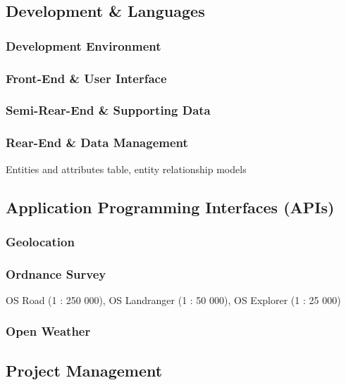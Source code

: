 \documentclass[11pt, english]{article}
\begin{document}
	\subsection{Development \& Languages}

		\subsubsection{Development Environment}

		\subsubsection{Front-End \& User Interface}

		\subsubsection{Semi-Rear-End \& Supporting Data}

		\subsubsection{Rear-End \& Data Management}

		Entities and attributes table, entity relationship models

	\subsection{Application Programming Interfaces (APIs)}

		\subsubsection{Geolocation}

		\subsubsection{Ordnance Survey}

		OS Road (1 : 250 000), OS Landranger (1 : 50 000), OS Explorer (1 : 25 000)

		\subsubsection{Open Weather}

	\subsection{Project Management}
\end{document}
